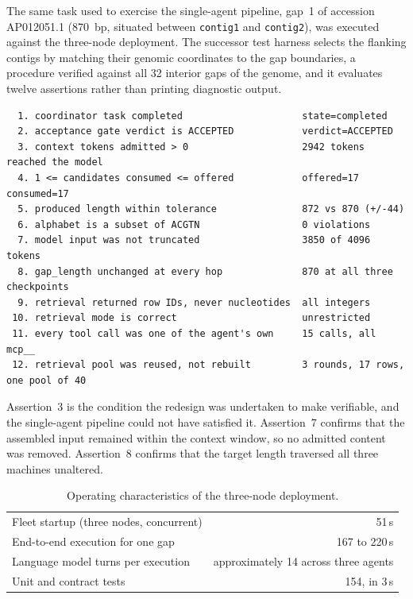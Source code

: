 The same task used to exercise the single-agent pipeline, gap~1 of accession AP012051.1
(870~bp, situated between \texttt{contig1} and \texttt{contig2}), was executed against the
three-node deployment. The successor test harness selects the flanking contigs by matching
their genomic coordinates to the gap boundaries, a procedure verified against all 32 interior
gaps of the genome, and it evaluates twelve assertions rather than printing diagnostic output.

\begin{verbatim}
  1. coordinator task completed                     state=completed
  2. acceptance gate verdict is ACCEPTED            verdict=ACCEPTED
  3. context tokens admitted > 0                    2942 tokens reached the model
  4. 1 <= candidates consumed <= offered            offered=17 consumed=17
  5. produced length within tolerance               872 vs 870 (+/-44)
  6. alphabet is a subset of ACGTN                  0 violations
  7. model input was not truncated                  3850 of 4096 tokens
  8. gap_length unchanged at every hop              870 at all three checkpoints
  9. retrieval returned row IDs, never nucleotides  all integers
 10. retrieval mode is correct                      unrestricted
 11. every tool call was one of the agent's own     15 calls, all mcp__
 12. retrieval pool was reused, not rebuilt         3 rounds, 17 rows, one pool of 40
\end{verbatim}

Assertion~3 is the condition the redesign was undertaken to make verifiable, and the
single-agent pipeline could not have satisfied it. Assertion~7 confirms that the assembled
input remained within the context window, so no admitted content was removed. Assertion~8
confirms that the target length traversed all three machines unaltered.

\begin{table}[H]
\centering
\begin{tabular}{lr}
\toprule
Fleet startup (three nodes, concurrent) & 51\,s \\
End-to-end execution for one gap        & 167 to 220\,s \\
Language model turns per execution      & approximately 14 across three agents \\
Unit and contract tests                 & 154, in 3\,s \\
\bottomrule
\end{tabular}
\caption{Operating characteristics of the three-node deployment.}
\label{tab:cost}
\end{table}

